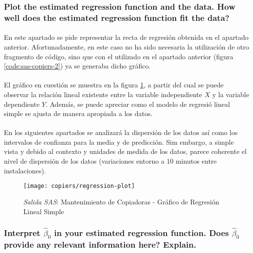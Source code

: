 \documentclass{article}
\begin{document}
      \subsubsection{Plot the estimated regression function and the data. How well does the estimated regression function fit the data?}

        \paragraph{}
        En este apartado se pide representar la recta de regresión obtenida en el apartado anterior. Afortunadamente, en este caso no ha sido necesaria la utilización de otro fragmento de código, sino que con el utilizado en el apartado anterior (figura \ref{code:sas-copiers-2}) ya se generaba dicho gráfico.

        \paragraph{}
        El gráfico en cuestión se muestra en la figura \ref{img:copiers-regression-plot}, a partir del cual se puede observar la relación lineal existente entre la variable independiente $X$ y la variable dependiente $Y$. Además, se puede apreciar como el modelo de regresió lineal simple se ajusta de manera apropiada a los datos.

        \paragraph{}
        En los siguientes apartados se analizará la dispersión de los datos así como los intervalos de confianza para la media y de predicción. Sim embargo, a simple vista y debido al contexto y unidades de medida de los datos, parece coherente el nivel de dispersión de los datos (variaciones entorno a $10$ minutos entre instalaciones).

        \begin{figure}[!h]
          \centering
          \texttt{[image: copiers/regression-plot]}
          \caption{\emph{Salida SAS}: Mantenimiento de Copiadoras - Gráfico de Regresión Lineal Simple}
          \label{img:copiers-regression-plot}
        \end{figure}

      \subsubsection{Interpret $\widehat{\beta}_0$ in your estimated regression function. Does $\widehat{\beta}_0$ provide any relevant information here? Explain.}
\end{document}
